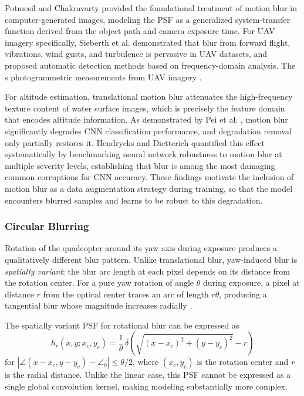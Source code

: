    Potmesil and Chakravarty \cite{Potmesil1983} provided the foundational treatment of motion blur in computer-generated images, modeling the PSF as a generalized system-transfer function derived from the object path and camera exposure time. For UAV imagery specifically, Sieberth et al. \cite{Sieberth2016} demonstrated that blur from forward flight, vibrations, wind gusts, and turbulence is pervasive in UAV datasets, and proposed automatic detection methods based on frequency-domain analysis. The s
    photogrammetric measurements from UAV imagery \cite{Sieberth2014}.

    For altitude estimation, translational motion blur attenuates the high-frequency texture content of water surface images, which is precisely the feature domain that encodes altitude information. As demonstrated by Pei et al. \cite{Pei2021}, motion blur significantly degrades CNN classification performance, and degradation removal only partially restores it. Hendrycks and Dietterich \cite{Hendrycks2019} quantified this effect systematically by benchmarking neural network robustness to motion blur at multiple severity levels, establishing that blur is among the most damaging common corruptions for CNN accuracy. These findings motivate the inclusion of motion blur as a data augmentation strategy during training, so that the model encounters blurred samples and learns to be robust to this degradation.

    \subsubsection{Circular Blurring}

    Rotation of the quadcopter around its yaw axis during exposure produces a qualitatively different blur pattern. Unlike translational blur, yaw-induced blur is \emph{spatially variant}: the blur arc length at each pixel depends on its distance from the rotation center. For a pure yaw rotation of angle $\theta$ during exposure, a pixel at distance $r$ from the optical center traces an arc of length $r\theta$, producing a tangential blur whose magnitude increases radially \cite{Whyte2012}.

    The spatially variant PSF for rotational blur can be expressed as
    \begin{equation}
        h_r(x, y; x_c, y_c) = \frac{1}{\theta} \, \delta\!\left(\sqrt{(x-x_c)^2 + (y-y_c)^2} - r\right)
        \label{eq:rotational_psf}
    \end{equation}
    for $|\angle(x-x_c, y-y_c) - \angle_0| \leq \theta/2$, where $(x_c, y_c)$ is the rotation center and $r$ is the radial distance. Unlike the linear case, this PSF cannot be expressed as a single global convolution kernel, making modeling substantially more complex.

